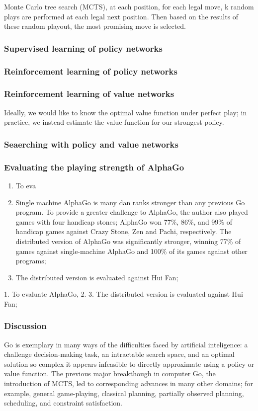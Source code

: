 Monte Carlo tree search (MCTS), at each position, for each legal move, k random plays are performed at each legal next position. Then based on the results of these random playout, the most promising move is selected.
\subsubsection{Supervised learning of policy networks}

\subsubsection{Reinforcement learning of policy networks}
\subsubsection{Reinforcement learning of value networks}
Ideally, we would like to know the optimal value function under perfect play; in practice, we instead estimate the value function for our strongest policy.
\subsubsection{Seaerching with policy and value networks}
\subsubsection{Evaluating the playing strength of AlphaGo}
\begin{enumerate}
	\item To eva
	\item Single machine AlphaGo is many dan ranks stronger than any previous Go program. To provide a greater challenge to AlphaGo, the author also played games with four handicap stones; AlphaGo won 77\%, 86\%, and 99\% of handicap games against Crazy Stone, Zen and Pachi, respectively. The distributed version of AlphaGo was significantly stronger, winning 77\% of games against single-machine AlphaGo and 100\% of its games against other programs;
	\item The distributed version is evaluated against Hui Fan;
\end{enumerate}
1. To evaluate AlphaGo, 
2.
3. The distributed version is evaluated against Hui Fan;
\subsubsection{Discussion}
Go is exemplary in many ways of the difficulties faced by artificial inteligence: a challenge decision-making task, an intractable search space, and an optimal solution so complex it appears infeasible to directly approximate using a policy or value function. The previous major breakthough in computer Go, the introduction of MCTS, led to corresponding advances in many other domains; for example, general game-playing, classical planning, partially observed planning, scheduling, and constraint satisfaction.